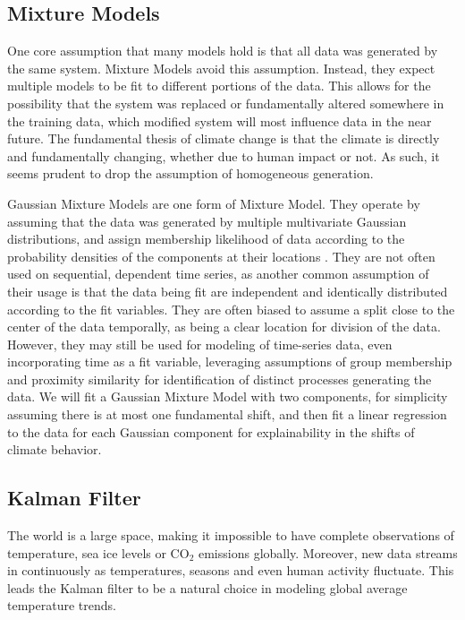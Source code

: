 \documentclass[11pt]{amsart}
\begin{document}
\subsection{Mixture Models}
One core assumption that many models hold is that all data was generated by the same system. 
Mixture Models avoid this assumption.  
Instead, they expect multiple models to be fit to different portions of the data.
This allows for the possibility that the system was replaced or fundamentally altered somewhere in the training data, which modified system will most influence data in the near future.
The fundamental thesis of climate change is that the climate is directly and fundamentally changing, whether due to human impact or not.
As such, it seems prudent to drop the assumption of homogeneous generation.

Gaussian Mixture Models are one form of Mixture Model. 
They operate by assuming that the data was generated by multiple multivariate Gaussian distributions, and assign membership likelihood of data according to the probability densities of the components at their locations \cite{pearson1894iii}.
They are not often used on sequential, dependent time series, as another common assumption of their usage is that the data being fit are independent and identically distributed according to the fit variables.
They are often biased to assume a split close to the center of the data temporally, as being a clear location for division of the data.
However, they may still be used for modeling of time-series data, even incorporating time as a fit variable, leveraging assumptions of group membership and proximity similarity for identification of distinct processes generating the data.
We will fit a Gaussian Mixture Model with two components, for simplicity assuming there is at most one fundamental shift, and then fit a linear regression to the data for each Gaussian component for explainability in the shifts of climate behavior.

\subsection{Kalman Filter}

\par The world is a large space, making it impossible to have complete observations of temperature, sea ice levels or CO$_2$ emissions globally.
Moreover, new data streams in continuously as temperatures, seasons and even human activity fluctuate.
This leads the Kalman filter to be a natural choice in modeling global average temperature trends.
\end{document}
